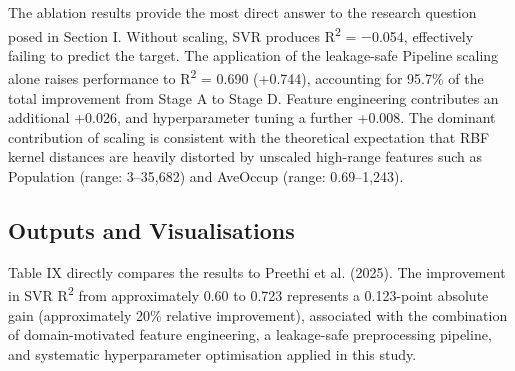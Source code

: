 \documentclass[pdflatex,sn-mathphys-num]{sn-jnl}
\begin{document}
The ablation results provide the most direct answer to the research question posed in Section I. Without scaling, SVR produces R\textsuperscript{2} = $-$0.054, effectively failing to predict the target. The application of the leakage-safe Pipeline scaling alone raises performance to R\textsuperscript{2} = 0.690 (+0.744), accounting for 95.7\% of the total improvement from Stage A to Stage D. Feature engineering contributes an additional +0.026, and hyperparameter tuning a further +0.008. The dominant contribution of scaling is consistent with the theoretical expectation that RBF kernel distances are heavily distorted by unscaled high-range features such as Population (range: 3–35,682) and AveOccup (range: 0.69–1,243).

\subsection{Outputs and Visualisations}
Table IX directly compares the results to Preethi et al. (2025). The improvement in SVR R\textsuperscript{2} from approximately 0.60 to 0.723 represents a 0.123-point absolute gain (approximately 20\% relative improvement), associated with the combination of domain-motivated feature engineering, a leakage-safe preprocessing pipeline, and systematic hyperparameter optimisation applied in this study.
\end{document}
